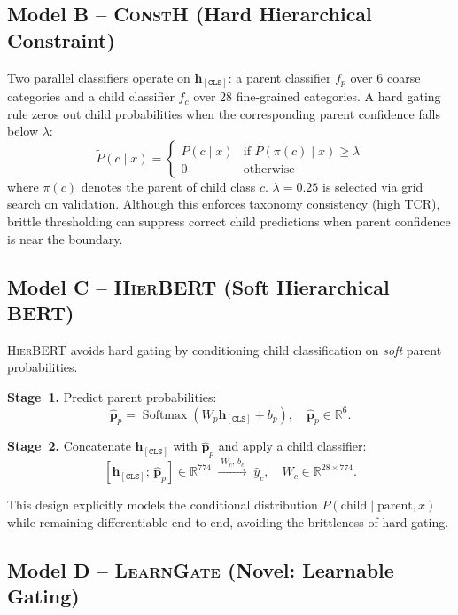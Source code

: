 \documentclass{article}
\newcommand{\R}{\mathbb{R}}
\newcommand{\modB}{\textsc{ConstH}}
\newcommand{\modC}{\textsc{HierBERT}}
\newcommand{\modD}{\textsc{LearnGate}}
\newcommand{\hcls}{\mathbf{h}_{[\texttt{CLS}]}}
\begin{document}
\subsection{Model B -- \modB{} (Hard Hierarchical Constraint)}

Two parallel classifiers operate on $\hcls$: a parent classifier
$f_p$ over 6 coarse categories and a child classifier $f_c$ over 28
fine-grained categories.
A hard gating rule zeros out child probabilities when the corresponding
parent confidence falls below $\lambda$:
\[
\tilde{P}(c \mid x) =
\begin{cases}
P(c \mid x) & \text{if } P(\pi(c) \mid x) \geq \lambda \\
0           & \text{otherwise}
\end{cases}
\]
where $\pi(c)$ denotes the parent of child class $c$.
$\lambda = 0.25$ is selected via grid search on validation.
Although this enforces taxonomy consistency (high TCR), brittle
thresholding can suppress correct child predictions when parent
confidence is near the boundary.

\subsection{Model C -- \modC{} (Soft Hierarchical BERT)}

\modC{} avoids hard gating by conditioning child classification on
\emph{soft} parent probabilities.

\textbf{Stage~1.} Predict parent probabilities:
\[
\hat{\mathbf{p}}_p = \operatorname{Softmax}(W_p \hcls + b_p),
\quad \hat{\mathbf{p}}_p \in \R^{6}.
\]

\textbf{Stage~2.} Concatenate $\hcls$ with $\hat{\mathbf{p}}_p$ and
apply a child classifier:
\[
[\hcls;\,\hat{\mathbf{p}}_p] \in \R^{774}
\;\xrightarrow{\;W_c,\, b_c\;}\; \hat{y}_c,
\quad W_c \in \R^{28 \times 774}.
\]

This design explicitly models the conditional distribution
$P(\mathrm{child} \mid \mathrm{parent}, x)$ while remaining
differentiable end-to-end, avoiding the brittleness of hard gating.

\subsection{Model D -- \modD{} (Novel: Learnable Gating)}
\label{sec:learngate}
\end{document}
